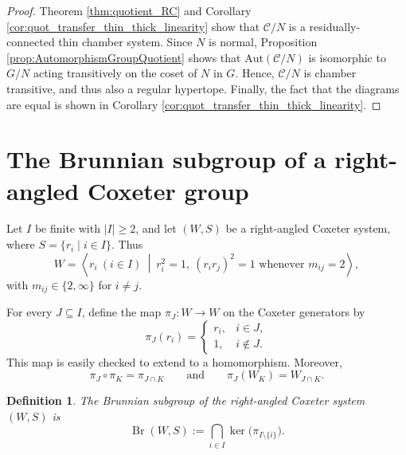 \documentclass[11pt,letterpaper]{amsart}
\newtheorem{definition}[prop]{Definition}
\newcommand{\Aut}{\mathrm{Aut}}
\newcommand{\C}{\mathcal{C}}
\newcommand{\Br}{\operatorname{Br}}
\begin{document}
\begin{proof}
    Theorem \ref{thm:quotient_RC} and Corollary \ref{cor:quot_transfer_thin_thick_linearity} show that $\C/N$ is a residually-connected thin chamber system. Since $N$ is normal, Proposition \ref{prop:AutomorphismGroupQuotient} shows that $\Aut(\C/N)$ is isomorphic to $G/N$ acting transitively on the coset of $N$ in $G$. Hence, $\C/N$ is chamber transitive, and thus also a regular hypertope. Finally, the fact that the diagrams are equal is shown in Corollary \ref{cor:quot_transfer_thin_thick_linearity}.
\end{proof}

\section{The Brunnian subgroup of a right-angled Coxeter group}\label{sec:brunnian}

Let $I$ be finite with $|I|\geq2$, and let $(W,S)$ be a right-angled Coxeter
system, where $S=\{r_i\mid i\in I\}$.  Thus
\[
    W=\left\langle r_i\ (i\in I)\ \middle|\
        r_i^2=1,\ (r_ir_j)^2=1\text{ whenever }m_{ij}=2
      \right\rangle,
\]
with $m_{ij}\in\{2,\infty\}$ for $i\neq j$.

For every $J\subseteq I$, define the map $\pi_J\colon W\to W$ on the Coxeter
generators by
\begin{equation}
\label{eq:deletion-retraction}
    \pi_J(r_i)=
    \begin{cases}
        r_i,&i\in J,\\
        1,&i\notin J.
    \end{cases}
\end{equation}
This map is easily checked to extend to a homomorphism.
Moreover,
\begin{equation}
\label{eq:retraction-identities}
    \pi_J\circ\pi_K=\pi_{J\cap K}
    \qquad\text{and}\qquad
    \pi_J(W_K)=W_{J\cap K}.
\end{equation}

\begin{definition}
The \emph{Brunnian subgroup} of the right-angled Coxeter system $(W,S)$ is
\begin{equation*}
    \Br(W,S)
      :=\bigcap_{i\in I}\ker\bigl(\pi_{I\setminus\{i\}}\bigr).
\end{equation*}
\end{definition}
\end{document}
